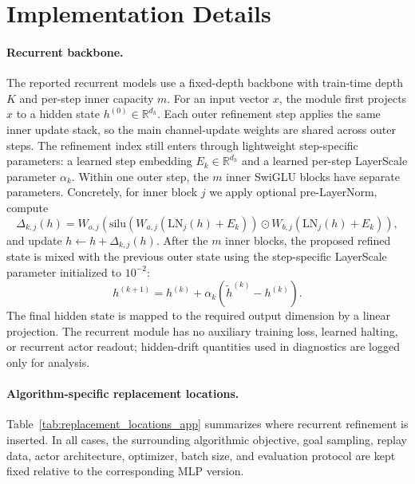 \documentclass{article}
\begin{document}
\section{Implementation Details}
\label{app:implementation-details}

\paragraph{Recurrent backbone.}
The reported recurrent models use a fixed-depth backbone with train-time depth $K$ and per-step inner capacity $m$.
For an input vector $x$, the module first projects $x$ to a hidden state $h^{(0)}\in\mathbb{R}^{d_h}$.
Each outer refinement step applies the same inner update stack, so the main channel-update weights are shared across outer steps.
The refinement index still enters through lightweight step-specific parameters: a learned step embedding $E_k\in\mathbb{R}^{d_h}$ and a learned per-step LayerScale parameter $\alpha_k$.
Within one outer step, the $m$ inner SwiGLU blocks have separate parameters.
Concretely, for inner block $j$ we apply optional pre-LayerNorm, compute
\[
\Delta_{k,j}(h)=W_{o,j}\left(\mathrm{silu}(W_{a,j}(\mathrm{LN}_j(h)+E_k))\odot W_{b,j}(\mathrm{LN}_j(h)+E_k)\right),
\]
and update $h\leftarrow h+\Delta_{k,j}(h)$.
After the $m$ inner blocks, the proposed refined state is mixed with the previous outer state using the step-specific LayerScale parameter initialized to $10^{-2}$:
\[
h^{(k+1)} = h^{(k)}+\alpha_k(\tilde h^{(k)}-h^{(k)}).
\]
The final hidden state is mapped to the required output dimension by a linear projection.
The recurrent module has no auxiliary training loss, learned halting, or recurrent actor readout; hidden-drift quantities used in diagnostics are logged only for analysis.

\paragraph{Algorithm-specific replacement locations.}
Table~\ref{tab:replacement_locations_app} summarizes where recurrent refinement is inserted.
In all cases, the surrounding algorithmic objective, goal sampling, replay data, actor architecture, optimizer, batch size, and evaluation protocol are kept fixed relative to the corresponding MLP version.
\end{document}
